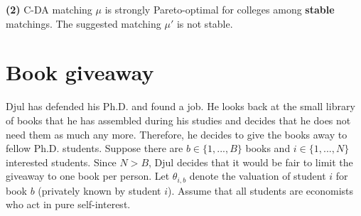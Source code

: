 \documentclass[a4paper]{article}
\begin{document}
	\textbf{(2)} %
	C-DA matching $\mu$ is strongly Pareto-optimal for colleges among \textbf{stable} matchings. The suggested matching $\mu'$ is not stable.
\fi



\section{Book giveaway}
Djul has defended his Ph.D. and found a job. He looks back at the small library of books that he has assembled during his studies and decides that he does not need them as much any more. Therefore, he decides to give the books away to fellow Ph.D. students. Suppose there are $b \in \{1,...,B\}$ books and $i \in \{1,...,N\}$ interested students. Since $N > B$, Djul decides that it would be fair to limit the giveaway to one book per person. Let $\theta_{i,b}$ denote the valuation of student $i$ for book $b$ (privately known by student $i$). Assume that all students are economists who act in pure self-interest.
\end{document}
